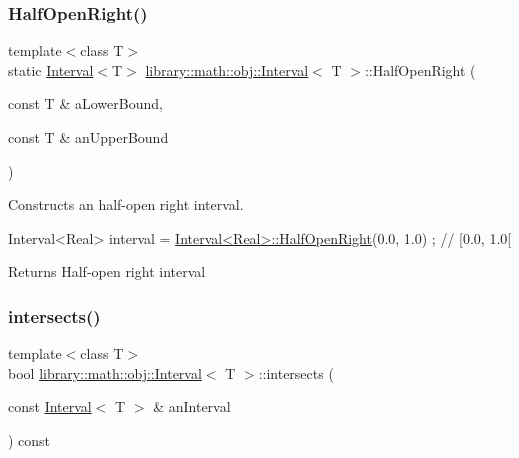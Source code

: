\subsubsection{\texorpdfstring{Half\+Open\+Right()}{HalfOpenRight()}}
{\footnotesize\ttfamily template$<$class T$>$ \\
static \hyperlink{classlibrary_1_1math_1_1obj_1_1_interval}{Interval}$<$T$>$ \hyperlink{classlibrary_1_1math_1_1obj_1_1_interval}{library\+::math\+::obj\+::\+Interval}$<$ T $>$\+::Half\+Open\+Right (\begin{DoxyParamCaption}\item[{const T \&}]{a\+Lower\+Bound,  }\item[{const T \&}]{an\+Upper\+Bound }\end{DoxyParamCaption})\hspace{0.3cm}{\ttfamily [static]}}



Constructs an half-\/open right interval. 


\begin{DoxyCode}
Interval<Real> interval = \hyperlink{classlibrary_1_1math_1_1obj_1_1_interval_a1a15d0518cc69fa3e442fc39c0622477}{Interval<Real>::HalfOpenRight}(0.0, 1.0) ; \textcolor{comment}{// [0.0,
       1.0[}
\end{DoxyCode}


\begin{DoxyReturn}{Returns}
Half-\/open right interval 
\end{DoxyReturn}
\mbox{\label{classlibrary_1_1math_1_1obj_1_1_interval_aba618feb6e4b6d052999c2b8c8c0b06a}} 
\subsubsection{\texorpdfstring{intersects()}{intersects()}}
{\footnotesize\ttfamily template$<$class T$>$ \\
bool \hyperlink{classlibrary_1_1math_1_1obj_1_1_interval}{library\+::math\+::obj\+::\+Interval}$<$ T $>$\+::intersects (\begin{DoxyParamCaption}\item[{const \hyperlink{classlibrary_1_1math_1_1obj_1_1_interval}{Interval}$<$ T $>$ \&}]{an\+Interval }\end{DoxyParamCaption}) const}



